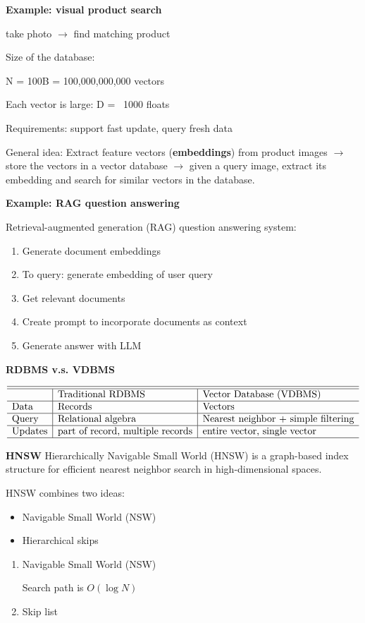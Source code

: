\documentclass[11pt,a4paper]{article}
\begin{document}
\textbf{Example: visual product search} \par
take photo $\rightarrow$ find matching product \par
Size of the database: \par
N = 100B = 100,000,000,000 vectors \par
Each vector is large: D = ~1000 floats \par
Requirements: support fast update, query fresh data \par

General idea:
Extract feature vectors (\textbf{embeddings}) from product images $\rightarrow$ store the vectors in a vector database $\rightarrow$ given a query image, extract its embedding and search for similar vectors in the database.

\textbf{Example: RAG question answering} \par
Retrieval-augmented generation (RAG) question answering system:
\begin{enumerate}
    \item [1. ] Generate document embeddings
    \item [2. ] To query: generate embedding of user query
    \item [3. ] Get relevant documents
    \item [4. ] Create prompt to incorporate documents as context
    \item [5. ] Generate answer with LLM
\end{enumerate}

\textbf{RDBMS v.s. VDBMS} \par
\[
\begin{array}{l|l|l}
    \hline\hline
    & \text{Traditional RDBMS} & \text{Vector Database (VDBMS)} \\
    \hline
    \text{Data} & \text{Records} & \text{Vectors} \\
    \hline
    \text{Query} & \text{Relational algebra} & \text{Nearest neighbor + simple filtering} \\
    \hline
    \text{Updates} & \text{part of record, multiple records} & \text{entire vector, single vector} \\
    \hline
\end{array}
\]

\textbf{HNSW}
Hierarchically Navigable Small World (HNSW) is a graph-based index structure for efficient nearest neighbor search in high-dimensional spaces. \par
HNSW combines two ideas:
\begin{itemize}
    \item Navigable Small World (NSW)
    \item Hierarchical skips 
\end{itemize}

\begin{enumerate}
    \item [1. ] Navigable Small World (NSW) \par
        Search path is $O(\log N)$

    \item [2. ] Skip list \par

\end{enumerate}
\end{document}
